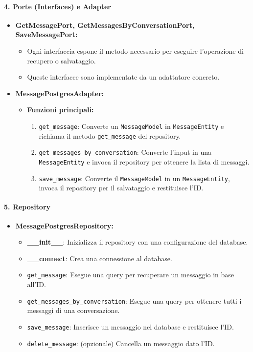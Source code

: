     \paragraph{4. Porte (Interfaces) e Adapter}
    \begin{itemize}
        \item \textbf{GetMessagePort, GetMessagesByConversationPort, SaveMessagePort:}
        \begin{itemize}
            \item Ogni interfaccia espone il metodo necessario per eseguire l’operazione di recupero o salvataggio.
            \item Queste interfacce sono implementate da un adattatore concreto.
        \end{itemize}
        \item \textbf{MessagePostgresAdapter:}
        \begin{itemize}
            \item \textbf{Funzioni principali:}
            \begin{enumerate}
                \item \texttt{get\_message}: Converte un \texttt{MessageModel} in \texttt{MessageEntity} e richiama il metodo \texttt{get\_message} del repository.
                \item \texttt{get\_messages\_by\_conversation}: Converte l’input in una \texttt{MessageEntity} e invoca il repository per ottenere la lista di messaggi.
                \item \texttt{save\_message}: Converte il \texttt{MessageModel} in un \texttt{MessageEntity}, invoca il repository per il salvataggio e restituisce l’ID.
            \end{enumerate}
        \end{itemize}
    \end{itemize}

    \paragraph{5. Repository}
    \begin{itemize}
        \item \textbf{MessagePostgresRepository:}
        \begin{itemize}
            \item \textbf{\_\_init\_\_}: Inizializza il repository con una configurazione del database.
            \item \textbf{\_\_connect}: Crea una connessione al database.
            \item \texttt{get\_message}: Esegue una query per recuperare un messaggio in base all’ID.
            \item \texttt{get\_messages\_by\_conversation}: Esegue una query per ottenere tutti i messaggi di una conversazione.
            \item \texttt{save\_message}: Inserisce un messaggio nel database e restituisce l'ID.
            \item \texttt{delete\_message}: (opzionale) Cancella un messaggio dato l'ID.
        \end{itemize}
    \end{itemize}

